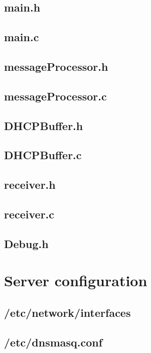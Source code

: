 \documentclass[11pt,a4paper]{scrartcl}
\begin{document}
\subsection{main.h}


\subsection{main.c}


\subsection{messageProcessor.h}


\subsection{messageProcessor.c}


\subsection{DHCPBuffer.h}


\subsection{DHCPBuffer.c}


\subsection{receiver.h}


\subsection{receiver.c}


\subsection{Debug.h}


\section{Server configuration} \label{app:serverconfig}
\subsection{/etc/network/interfaces}


\subsection{/etc/dnsmasq.conf}

\end{document}
